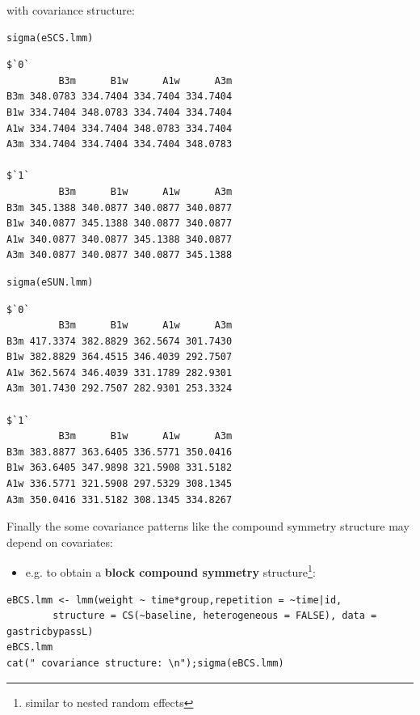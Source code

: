 \documentclass[12pt]{article}
\begin{document}
with covariance structure:

\bigskip

\begin{minipage}{0.47\linewidth}
\lstset{language=r,label= ,caption= ,captionpos=b,numbers=none}
\begin{lstlisting}
sigma(eSCS.lmm)
\end{lstlisting}

\begin{verbatim}
$`0`
         B3m      B1w      A1w      A3m
B3m 348.0783 334.7404 334.7404 334.7404
B1w 334.7404 348.0783 334.7404 334.7404
A1w 334.7404 334.7404 348.0783 334.7404
A3m 334.7404 334.7404 334.7404 348.0783

$`1`
         B3m      B1w      A1w      A3m
B3m 345.1388 340.0877 340.0877 340.0877
B1w 340.0877 345.1388 340.0877 340.0877
A1w 340.0877 340.0877 345.1388 340.0877
A3m 340.0877 340.0877 340.0877 345.1388
\end{verbatim}
\end{minipage}
\begin{minipage}{0.47\linewidth}
\lstset{language=r,label= ,caption= ,captionpos=b,numbers=none}
\begin{lstlisting}
sigma(eSUN.lmm)
\end{lstlisting}

\begin{verbatim}
$`0`
         B3m      B1w      A1w      A3m
B3m 417.3374 382.8829 362.5674 301.7430
B1w 382.8829 364.4515 346.4039 292.7507
A1w 362.5674 346.4039 331.1789 282.9301
A3m 301.7430 292.7507 282.9301 253.3324

$`1`
         B3m      B1w      A1w      A3m
B3m 383.8877 363.6405 336.5771 350.0416
B1w 363.6405 347.9898 321.5908 331.5182
A1w 336.5771 321.5908 297.5329 308.1345
A3m 350.0416 331.5182 308.1345 334.8267
\end{verbatim}
\end{minipage}

\clearpage

\noindent Finally the some covariance patterns like the compound
symmetry structure may depend on covariates:
\begin{itemize}
\item e.g. to obtain a \textbf{block compound symmetry} structure\footnote{similar to
nested random effects}:
\end{itemize}
\lstset{language=r,label= ,caption= ,captionpos=b,numbers=none}
\begin{lstlisting}
eBCS.lmm <- lmm(weight ~ time*group,repetition = ~time|id,
		structure = CS(~baseline, heterogeneous = FALSE), data = gastricbypassL)
eBCS.lmm
cat(" covariance structure: \n");sigma(eBCS.lmm)
\end{lstlisting}
\end{document}
